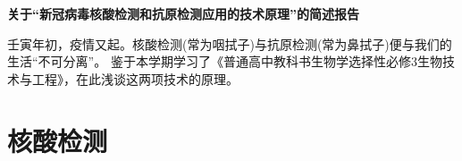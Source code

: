 \documentclass[UTF8,a4paper,11 pt]{ctexart}
\begin{document}
	\setlength{\lineskip}{8pt}
	\setlength{\lineskiplimit}{8pt}
	\pagestyle{fancy}
	\fancyhead[C]{} %
	\fancyfoot[C]{\thepage}
	\begin{center}
		\LARGE{\textbf{关于“新冠病毒核酸检测和抗原检测应用的技术原理”的简述报告}}
	\end{center}
	\mbox{\qquad}壬寅年初，疫情又起。核酸检测(常为咽拭子)与抗原检测(常为鼻拭子)便与我们的生活“不可分离”。
	鉴于本学期学习了《普通高中教科书\:\:生物学\:\:选择性必修3\:\:生物技术与工程》，在此浅谈这两项技术的原理。
	\part{核酸检测}
	\def\CD#1{
		\edef\code{
			\unexpanded{\begin{scope}[xshift=}#1
				\unexpanded{cm, yshift=2.7 cm]%
					\draw[fill=purple] (0,-1) -- (0,0)--(.5,0)--(.5,-1)arc (0:180:0.25);
					\node at (.25,-.25) {C};
			\end{scope}}
		}\code
	}
	\def\GD#1{
		\edef\code{
			\unexpanded{\begin{scope}[xshift=}#1
				\unexpanded{cm, yshift=2.7 cm]%
					\draw[fill=blue] (0,-1.2) -- (0,0)--(.5,0)--(.5,-1.2)arc (0:-180:0.25);
					\node at (.25,-.25) {G};
			\end{scope}}
		}\code
	}
	\def\AD#1{
		\edef\code{
			\unexpanded{\begin{scope}[xshift=}#1
				\unexpanded{cm, yshift=2.7 cm]%
					\draw[fill=yellow] (0,-1.2) -- (0,0)--(.5,0)--(.5,-1.2) --(.25,-1.45)--(0,-1.2);
					\node at (.25,-.25) {A};
				\end{scope}
			}
		}\code
	}
	\def\UD#1{
		\edef\code{
			\unexpanded{
				\begin{scope}[xshift=}#1
				\unexpanded{cm, yshift=2.7 cm]%
					\draw[fill=orange] (0,-1) -- (0,0)--(.5,0)--(.5,-1) --(.25,-.75)--(0,-1);
					\node at (.25,-.25) {U};
				\end{scope}
			}
		}\code
	}
	\def\TD#1{
		\edef\code{
			\unexpanded{\begin{scope}[xshift=}#1
				\unexpanded{cm, yshift=2.7 cm]%
					\draw[fill=green] (0,-1) -- (0,0)--(.5,0)--(.5,-1) --(.25,-.75)--(0,-1);
					\node at (.25,-.25) {T};
				\end{scope}
			}
		}\code
	}
	\def\CU#1{
		\edef\code{
			\unexpanded{\begin{scope}[xshift=}#1
				\unexpanded{cm, yshift=.3 cm]%
					\draw[fill=purple] (0,1) -- (0,0)--(.5,0)--(.5,1)arc (0:-180:0.25);
					\node at (.25,.25) {C};
			\end{scope}}
		}\code
	}
\end{document}
